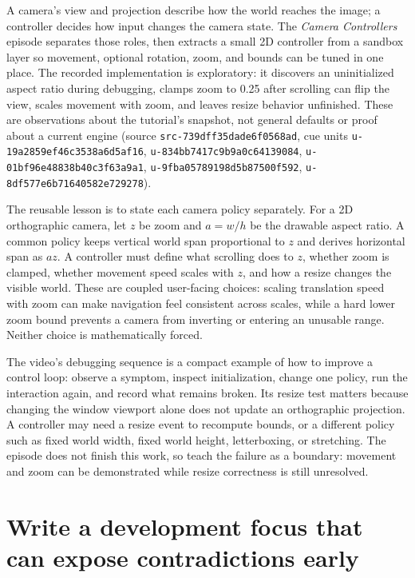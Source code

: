 A camera's view and projection describe how the world reaches the image; a controller decides how input changes the camera state. The \emph{Camera Controllers} episode separates those roles, then extracts a small 2D controller from a sandbox layer so movement, optional rotation, zoom, and bounds can be tuned in one place. The recorded implementation is exploratory: it discovers an uninitialized aspect ratio during debugging, clamps zoom to 0.25 after scrolling can flip the view, scales movement with zoom, and leaves resize behavior unfinished. These are observations about the tutorial's snapshot, not general defaults or proof about a current engine (source \texttt{src-739dff35dade6f0568ad}, cue units \texttt{u-19a2859ef46c3538a6d5af16}, \texttt{u-834bb7417c9b9a0c64139084}, \texttt{u-01bf96e48838b40c3f63a9a1}, \texttt{u-9fba05789198d5b87500f592}, \texttt{u-8df577e6b71640582e729278}).

The reusable lesson is to state each camera policy separately. For a 2D orthographic camera, let \(z\) be zoom and \(a=w/h\) be the drawable aspect ratio. A common policy keeps vertical world span proportional to \(z\) and derives horizontal span as \(az\). A controller must define what scrolling does to \(z\), whether zoom is clamped, whether movement speed scales with \(z\), and how a resize changes the visible world. These are coupled user-facing choices: scaling translation speed with zoom can make navigation feel consistent across scales, while a hard lower zoom bound prevents a camera from inverting or entering an unusable range. Neither choice is mathematically forced.

The video's debugging sequence is a compact example of how to improve a control loop: observe a symptom, inspect initialization, change one policy, run the interaction again, and record what remains broken. Its resize test matters because changing the window viewport alone does not update an orthographic projection. A controller may need a resize event to recompute bounds, or a different policy such as fixed world width, fixed world height, letterboxing, or stretching. The episode does not finish this work, so teach the failure as a boundary: movement and zoom can be demonstrated while resize correctness is still unresolved.

\section{Write a development focus that can expose contradictions early}\label{06-engine-ii-ch046-write-a-development-focus-that-can-expose-contradictions-early}

